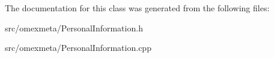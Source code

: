 The documentation for this class was generated from the following files\+:\begin{DoxyCompactItemize}
\item 
src/omexmeta/Personal\+Information.\+h\item 
src/omexmeta/Personal\+Information.\+cpp\end{DoxyCompactItemize}
